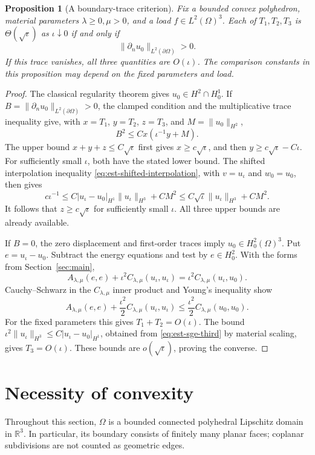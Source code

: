 \documentclass[11pt,a4paper]{article}
\newtheorem{proposition}[theorem]{Proposition}
\theoremstyle{remark}
\numberwithin{equation}{section}
\begin{document}
\begin{proposition}[A boundary-trace criterion]\label{prop:boundary-active}
Fix a bounded convex polyhedron, material parameters \(\lambda\ge0,\mu>0\),
and a load \(f\in L^2(\Omega)^3\). Each of \(T_1,T_2,T_3\) is
\(\Theta(\sqrt{\iota})\) as \(\iota\downarrow0\) if and only if
\[
 \|\partial_nu_0\|_{L^2(\partial\Omega)}>0.
\]
If this trace vanishes, all three quantities are \(O(\iota)\).
The comparison constants in this proposition may depend on the fixed
parameters and load.
\end{proposition}
\begin{proof}
The classical regularity theorem gives \(u_0\in H^2\cap H^1_0\).
If \(B=\|\partial_nu_0\|_{L^2(\partial\Omega)}>0\), the clamped
condition and the multiplicative trace inequality give, with
\(x=T_1\), \(y=T_2\), \(z=T_3\), and \(M=\|u_0\|_{H^2}\),
\[
 B^2\le Cx(\iota^{-1}y+M).
\]
The upper bound \(x+y+z\le C\sqrt{\iota}\) first gives
\(x\ge c\sqrt{\iota}\), and then
\(y\ge c\sqrt{\iota}-C\iota\).
For sufficiently small \(\iota\), both have the stated lower bound.
The shifted interpolation inequality
\eqref{eq:est-shifted-interpolation}, with \(v=u_\iota\) and \(w_0=u_0\),
then gives
\[
 c\iota^{-1}\le
 C|u_\iota-u_0|_{H^1}\|u_\iota\|_{H^3}+CM^2
 \le C\sqrt{\iota}\|u_\iota\|_{H^3}+CM^2.
\]
It follows that \(z\ge c\sqrt{\iota}\) for sufficiently small \(\iota\).
All three upper bounds are already available.

If \(B=0\), the zero displacement and first-order traces imply
\(u_0\in H^2_0(\Omega)^3\).
Put \(e=u_\iota-u_0\). Subtract the energy equations and test by
\(e\in H^2_0\). With the forms from Section~\ref{sec:main},
\[
 A_{\lambda,\mu}(e,e)+\iota^2C_{\lambda,\mu}(u_\iota,u_\iota)
 =\iota^2C_{\lambda,\mu}(u_\iota,u_0).
\]
Cauchy--Schwarz in the \(C_{\lambda,\mu}\) inner product and Young's
inequality show
\[
 A_{\lambda,\mu}(e,e)
 +\frac{\iota^2}{2}C_{\lambda,\mu}(u_\iota,u_\iota)
 \le\frac{\iota^2}{2}C_{\lambda,\mu}(u_0,u_0).
\]
For the fixed parameters this gives \(T_1+T_2=O(\iota)\).
The bound \(\iota^2\|u_\iota\|_{H^3}
\le C|u_\iota-u_0|_{H^1}\), obtained from
\eqref{eq:est-sge-third} by material scaling, gives \(T_3=O(\iota)\).
These bounds are \(o(\sqrt{\iota})\), proving the converse.
\end{proof}



\section{Necessity of convexity}\label{sec:necessity}
Throughout this section, $\Omega$ is a bounded connected polyhedral
Lipschitz domain in $\mathbb R^3$.  In particular, its boundary consists of
finitely many planar faces; coplanar subdivisions are not counted as
geometric edges.
\end{document}
